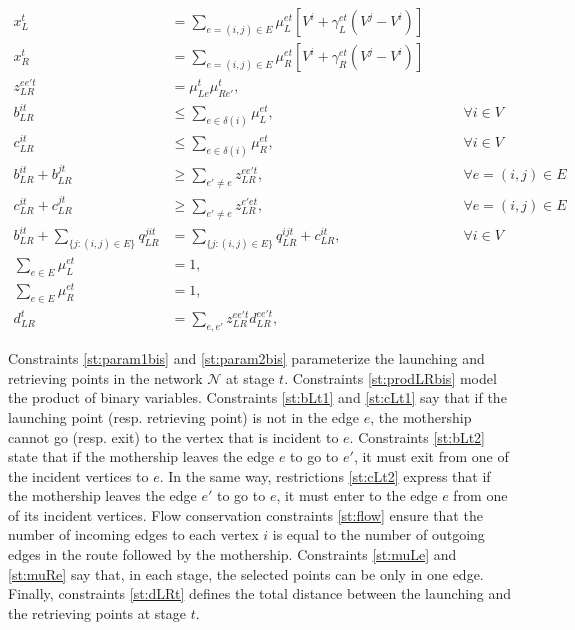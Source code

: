 \begin{align}
    x_L^t & = \sum_{e=(i, j)\in E} \mu_{L}^{et}\left[V^i + \gamma_{L}^{et}(V^j - V^i)\right]\label{st:param1bis}\\
    x_R^t & = \sum_{e=(i, j)\in E} \mu_{R}^{et}\left[ V^i + \gamma_{R}^{et}(V^j - V^i)\right]\label{st:param2bis}\\
    z_{LR}^{ee't} & = \mu_{Le}^t\mu_{Re'}^t,\label{st:prodLRbis}\\
    b_{LR}^{it} & \leq \sum_{e\in\delta(i)}\mu_{L}^{et}, \label{st:bLt1}&\qquad\forall i\in V \\
    c_{LR}^{it} & \leq \sum_{e\in\delta(i)}\mu_{R}^{et}, \label{st:cLt1}&\qquad\forall i\in V\\
    b_{LR}^{it} + b_{LR}^{jt} & \geq \sum_{e'\neq e} z_{LR}^{ee't}, &\qquad \forall e=(i, j)\in E\label{st:bLt2}\\
    c_{LR}^{it} + c_{LR}^{jt} & \geq \sum_{e'\neq e} z_{LR}^{e'et}, &\qquad \forall e=(i, j)\in E\label{st:cLt2}\\
    b_{LR}^{it} + \sum_{\{j:(i, j)\in E\}} q_{LR}^{jit} & = \sum_{\{j:(i, j)\in E\}} q_{LR}^{ijt} +  c_{LR}^{it}, \label{st:flow}&\qquad \forall i \in V\\
    \sum_{e\in E} \mu_{L}^{et} & = 1,  \label{st:muLe} \\
    \sum_{e\in E} \mu_{R}^{et} & = 1, \label{st:muRe}\\
    d_{LR}^t & = \sum_{e, e'} z_{LR}^{ee't} d_{LR}^{ee't}, \label{st:dLRt}
\end{align}

Constraints \eqref{st:param1bis} and \eqref{st:param2bis} parameterize the launching and retrieving points in the network $\mathcal N$ at stage $t$. Constraints \eqref{st:prodLRbis} model the product of binary variables. Constraints \eqref{st:bLt1} and \eqref{st:cLt1} say that if the launching point (resp. retrieving point) is not in the edge $e$, the mothership cannot go (resp. exit) to the vertex that is incident to $e$. Constraints \eqref{st:bLt2} state that if the mothership leaves the edge $e$ to go to $e'$, it must exit from one of the incident vertices to $e$. In the same way, restrictions \eqref{st:cLt2} express that if the mothership leaves the edge $e'$ to go to $e$, it must enter to the edge $e$ from one of its incident vertices. Flow conservation constraints \eqref{st:flow} ensure that the number of incoming edges to each vertex $i$ is equal to the number of outgoing edges in the route followed by the mothership. Constraints \eqref{st:muLe} and \eqref{st:muRe} say that, in each stage, the selected points can be only in one edge. Finally, constraints \eqref{st:dLRt} defines the total distance between the launching and the retrieving points at  stage $t$.

